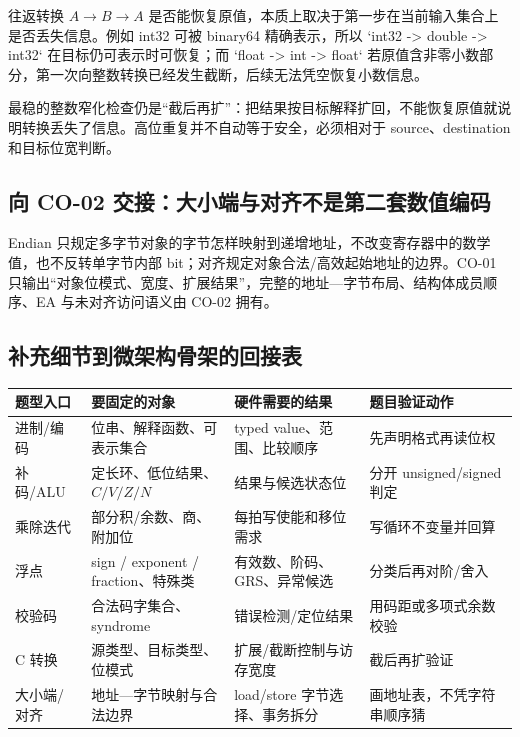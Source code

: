 \documentclass[UTF8,fontset=fandol,11pt,a4paper]{ctexart}
\begin{document}
往返转换 $A\to B\to A$ 是否能恢复原值，本质上取决于第一步在当前输入集合上是否丢失信息。例如 int32 可被 binary64 精确表示，所以 `int32 -> double -> int32` 在目标仍可表示时可恢复；而 `float -> int -> float` 若原值含非零小数部分，第一次向整数转换已经发生截断，后续无法凭空恢复小数信息。

最稳的整数窄化检查仍是“截后再扩”：把结果按目标解释扩回，不能恢复原值就说明转换丢失了信息。高位重复并不自动等于安全，必须相对于 source、destination 和目标位宽判断。

\subsection{向 CO-02 交接：大小端与对齐不是第二套数值编码}
Endian 只规定多字节对象的字节怎样映射到递增地址，不改变寄存器中的数学值，也不反转单字节内部 bit；对齐规定对象合法/高效起始地址的边界。CO-01 只输出“对象位模式、宽度、扩展结果”，完整的地址—字节布局、结构体成员顺序、EA 与未对齐访问语义由 CO-02 拥有。

\subsection{补充细节到微架构骨架的回接表}

\begin{center}\small
\begin{tabularx}{\linewidth}{L{2.4cm}L{2.8cm}L{2.8cm}Y}
\toprule
题型入口 & 要固定的对象 & 硬件需要的结果 & 题目验证动作 \\
\midrule
进制/编码 & 位串、解释函数、可表示集合 & typed value、范围、比较顺序 & 先声明格式再读位权 \\
补码/ALU & 定长环、低位结果、$C/V/Z/N$ & 结果与候选状态位 & 分开 unsigned/signed 判定 \\
乘除迭代 & 部分积/余数、商、附加位 & 每拍写使能和移位需求 & 写循环不变量并回算 \\
浮点 & sign / exponent / fraction、特殊类 & 有效数、阶码、GRS、异常候选 & 分类后再对阶/舍入 \\
校验码 & 合法码字集合、syndrome & 错误检测/定位结果 & 用码距或多项式余数校验 \\
C 转换 & 源类型、目标类型、位模式 & 扩展/截断控制与访存宽度 & 截后再扩验证 \\
大小端/对齐 & 地址—字节映射与合法边界 & load/store 字节选择、事务拆分 & 画地址表，不凭字符串顺序猜 \\
\bottomrule
\end{tabularx}
\end{center}
\end{document}
